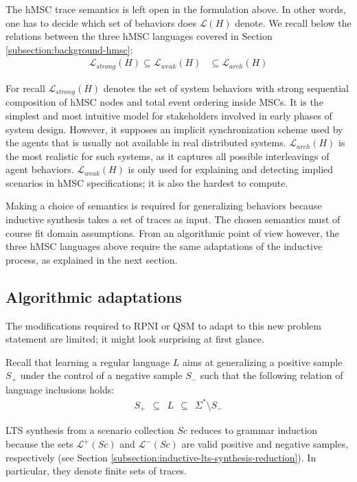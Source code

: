 The hMSC trace semantics is left open in the formulation above. In other words, one has to decide which set of behaviors does $\mathcal{L}(H)$ denote. We recall below the relations between the three hMSC languages covered in Section \ref{subsection:background-hmsc}: 
\begin{align}
\mathcal{L}_{strong}(H) \subseteq \mathcal{L}_{weak}(H) &\subseteq \mathcal{L}_{arch}(H)
\end{align}

For recall $\mathcal{L}_{strong}(H)$ denotes the set of system behaviors with strong sequential composition of hMSC nodes and total event ordering inside MSCs. It is the simplest and most intuitive model for stakeholders involved in early phases of system design. However, it supposes an implicit synchronization scheme used by the agents that is usually not available in real distributed systems. $\mathcal{L}_{arch}(H)$ is the most realistic for such systems, as it captures all possible interleavings of agent behaviors. $\mathcal{L}_{weak}(H)$ is only used for explaining and detecting implied scenarios in hMSC specifications; it is also the hardest to compute.

Making a choice of semantics is required for generalizing behaviors because inductive synthesis takes a set of traces as input. The chosen semantics must of course fit domain assumptions. From an algorithmic point of view however, the three hMSC languages above require the same adaptations of the inductive process, as explained in the next section.

\subsection{Algorithmic adaptations\label{subsection:hmsc-induction-algo-adaptation}}

The modifications required to RPNI or QSM to adapt to this new problem statement are limited; it might look surprising at first glance.

Recall that learning a regular language $L$ aims at generalizing a positive sample $S_+$ under the control of a negative sample $S_-$ such that the following relation of language inclusions holds:
\begin{align}
S_+~~\subseteq~~L~~\subseteq~~\Sigma^*\setminus S_-
\end{align}

LTS synthesis from a scenario collection $Sc$ reduces to grammar induction because the sets $\mathcal{L}^+(Sc)$ and $\mathcal{L}^-(Sc)$ are valid positive and negative samples, respectively (see Section \ref{subsection:inductive-lts-synthesis-reduction}). In particular, they denote finite sets of traces.

